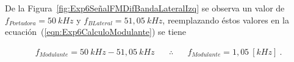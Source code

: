       De la Figura~\ref{fig:Exp6SeñalFMDifBandaLateralIzq} se observa un valor de 
      $f_{Portadora}=50~kHz$ y $f_{BLateral}=51,05~kHz$, reemplazando éstos valores en 
      la ecuación~(\ref{eqn:Exp6CalculoModulante}) se tiene 

      \begin{align*}
        f_{Modulante}=50~kHz-51,05~kHz \hspace{20pt} \therefore \hspace{20pt} \boxed{f_{Modulante}=1,05~[kHz]}~.
      \end{align*}
    
